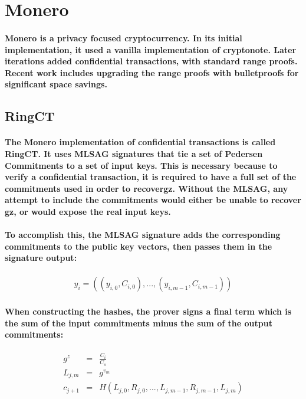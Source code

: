 \documentclass{article}
\begin{document}
\section{Monero}

\paragraph{Monero is a privacy focused cryptocurrency.  In its initial implementation, it used a vanilla implementation of cryptonote.  Later iterations added confidential transactions, with standard range proofs.  Recent work includes upgrading the range proofs with bulletproofs for significant space savings.}


\subsection{RingCT}

\paragraph{The Monero implementation of confidential transactions is called RingCT.  It uses MLSAG signatures that tie a set of Pedersen Commitments to a set of input keys.  This is necessary because to verify a confidential transaction, it is required to have a full set of the commitments used in order to recovergz.  Without the MLSAG, any attempt to include the commitments would either be unable to recover gz, or would expose the real input keys.}

\paragraph{To accomplish this, the MLSAG signature adds the corresponding commitments to the public key vectors, then passes them in the signature output:}

\begin{eqnarray}
  y_i = ((y_{i,0}, C_{i,0}), ..., (y_{i,m-1}, C_{i,m-1}))
\end{eqnarray}

\paragraph{When constructing the hashes, the prover signs a final term which is the sum of the input commitments minus the sum of the output commitments:}

\begin{eqnarray}
  g^z &=& \frac{C_i}{C_o}\\
  L_{j,m} &=& g^{v_m}\\
  c_{j+1} &=& H(L_{j,0}, R_{j,0}, ... , L_{j,m-1}, R_{j, m-1}, L_{j,m})
\end{eqnarray}
\end{document}

